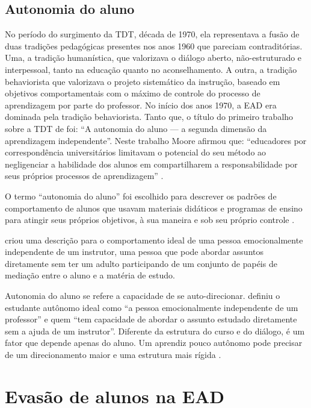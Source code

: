 \subsection{Autonomia do aluno}

No período do surgimento da TDT, década de 1970, ela representava a fusão de
duas tradições pedagógicas presentes nos anos 1960 que pareciam contraditórias.
Uma, a tradição humanística, que valorizava o diálogo aberto, não-estruturado e
interpessoal, tanto na educação quanto no aconselhamento. A outra, a tradição
behaviorista que valorizava o projeto sistemático da instrução, baseado em
objetivos comportamentais com o máximo de controle do processo de aprendizagem
por parte do professor. No início dos anos 1970, a EAD era dominada pela
tradição behaviorista. Tanto que, o título do primeiro trabalho sobre a TDT de
 foi: ``A autonomia do aluno --- a segunda dimensão
da aprendizagem independente''. Neste trabalho Moore afirmou que: ``educadores
por correspondência universitários limitavam o potencial do seu método ao
negligenciar a habilidade dos alunos em compartilharem a responsabilidade por
seus próprios processos de aprendizagem'' \cite{moore2008teoria}.

O termo ``autonomia do aluno'' foi escolhido para descrever os padrões de
comportamento de alunos que usavam materiais didáticos e programas de ensino
para atingir seus próprios objetivos, à sua maneira e sob seu próprio controle
\cite{moore2008teoria}.

 criou uma descrição para o
comportamento ideal de uma pessoa emocionalmente independente de um instrutor,
uma pessoa que pode abordar assuntos diretamente sem ter um adulto participando
de um conjunto de papéis de mediação entre o aluno e a matéria de estudo.

Autonomia do aluno  se refere a capacidade de se auto-direcionar.
 definiu o estudante autônomo ideal como ``a
pessoa emocionalmente independente de um professor'' e quem ``tem capacidade de
abordar o assunto estudado diretamente sem a ajuda de um instrutor''. Diferente
da estrutura do curso e do diálogo, é um fator que depende apenas do aluno. Um
aprendiz pouco autônomo pode precisar de um direcionamento maior e uma estrutura
mais rígida \cite{huang2016understanding}.

\section{Evasão de alunos na EAD}

